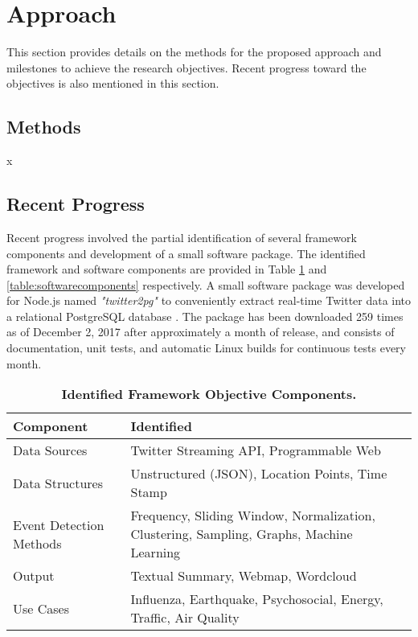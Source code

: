

\section{Approach} \label{approach}

This section provides details on the methods for  the proposed approach and milestones to achieve the research objectives. Recent progress toward the objectives is also mentioned in this section.

\subsection{Methods} \label{methods}

x

\subsection{Recent Progress} \label{recent-progress}

Recent progress involved the partial identification of several framework components and development of a small software package. The identified framework and software components are provided in Table \ref{table:frameworkcomponents} and \ref{table:softwarecomponents} respectively. A small software package was developed for Node.js \citep{Nodejs:2017} named \textit{"twitter2pg"}  \citep{Wen:2017} to conveniently extract real-time Twitter data into a relational PostgreSQL database \citep{Postgresql:2017}. The package has been downloaded 259 times as of December 2, 2017 after approximately a month of release, and consists of documentation, unit tests, and automatic Linux builds for continuous tests every month.

\begin{table}[!htb]
\centering
\caption{\textbf{Identified Framework Objective Components.}}
\label{table:frameworkcomponents}
\begin{tabular}{|p{2.5in}|p{3.5in}|}
\hline
\textbf{Component} & \textbf{Identified}\\
\hline
Data Sources & Twitter Streaming API, Programmable Web\\
\hline
Data Structures & Unstructured (JSON), Location Points, Time Stamp \\
\hline
Event Detection Methods & Frequency, Sliding Window, Normalization, Clustering, Sampling, Graphs, Machine Learning\\
\hline
Output & Textual Summary, Webmap, Wordcloud\\
\hline
Use Cases & Influenza, Earthquake, Psychosocial, Energy, Traffic, Air Quality\\
\hline
\end{tabular}
\end{table}

